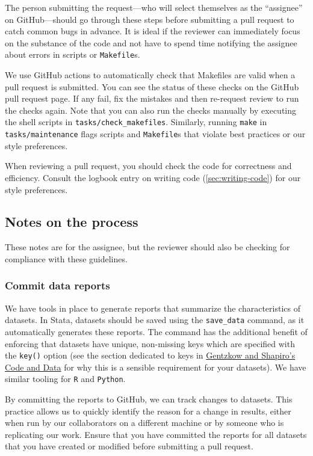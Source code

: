 The person submitting the request---who
will select themselves as the ``assignee'' on GitHub---should
go through these steps before submitting a pull request
to catch common bugs in advance.
It is ideal if the reviewer can immediately focus on the substance of the code
and not have to spend time notifying the assignee about errors in scripts or \texttt{Makefile}s.

We use GitHub actions to automatically check
that Makefiles are valid when a pull request is submitted.
You can see the status of these checks on the GitHub pull request page.
If any fail,
fix the mistakes and then re-request review to run the checks again.
Note that you can also run the checks manually by executing the shell
scripts in \texttt{tasks/check\_makefiles}.
Similarly, running \texttt{make} in \texttt{tasks/maintenance} flags scripts and \texttt{Makefile}s that
violate best practices or our style preferences.

When reviewing a pull request,
you should check the code for correctness and efficiency.
Consult the logbook entry on writing code (\ref{sec:writing-code}) for our style preferences.

\subsection{Notes on the process}
These notes are for the assignee,
but the reviewer should also be checking for compliance with these guidelines.

\subsubsection{Commit data reports}
We have tools in place to generate reports that summarize the characteristics of datasets.
In Stata, datasets should be saved using the \texttt{save\_data} command,
as it automatically generates these reports.
The command has the additional benefit of enforcing that datasets have unique,
non-missing keys which are specified with the \texttt{key()} option
 (see the section dedicated to keys in \href{https://web.stanford.edu/~gentzkow/research/CodeAndData.pdf}{Gentzkow and Shapiro's Code and Data} for why this is a sensible requirement for your datasets).
We have similar tooling for \texttt{R} and \texttt{Python}.

By committing the reports to GitHub, we can track changes to datasets.
This practice allows us to quickly identify the reason for a change in results,
either when run by our collaborators on a different machine or by someone
who is replicating our work.
Ensure that you have committed the reports for all datasets
that you have created or modified before submitting a pull request.

